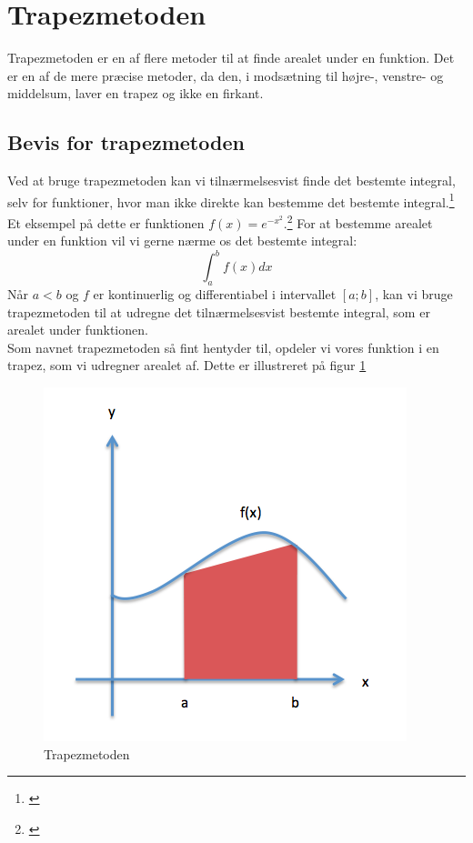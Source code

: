 \documentclass[12pt]{article}
\numberwithin{equation}{section}
\begin{document}
\section{Trapezmetoden}
\label{sec:trapezmetoden}
Trapezmetoden er en af flere metoder til at finde arealet under en funktion. Det er en af de mere præcise metoder, da den, i modsætning til højre-, venstre- og middelsum, laver en trapez og ikke en firkant.
\subsection{Bevis for trapezmetoden}
Ved at bruge trapezmetoden kan vi tilnærmelsesvist finde det bestemte integral, selv for funktioner, hvor man ikke direkte kan bestemme det bestemte integral.\footnote{\cite[s. 13]{2012matA}} Et eksempel på dette er funktionen $f(x)=e^{-x^{2}}$.\footnote{\cite[s. 12]{2012matA}}
For at bestemme arealet under en funktion vil vi gerne nærme os det bestemte integral:
\begin{equation}
\int_{a}^{b}f(x)dx \nonumber
\end{equation}
Når $a<b$ og $f$ er kontinuerlig og differentiabel i intervallet $[a;b]$, kan vi bruge trapezmetoden til at udregne det tilnærmelsesvist bestemte integral, som er arealet under funktionen.\\
Som navnet trapezmetoden så fint hentyder til, opdeler vi vores funktion i en trapez, som vi udregner arealet af. Dette er illustreret på figur \ref{fig:trapezmetoden}
\begin{figure}[H]
\centering
\includegraphics[scale=0.5]{Billeder/trapezmetoden.png}
\caption{Trapezmetoden}
\label{fig:trapezmetoden}
\end{figure}
\end{document}
